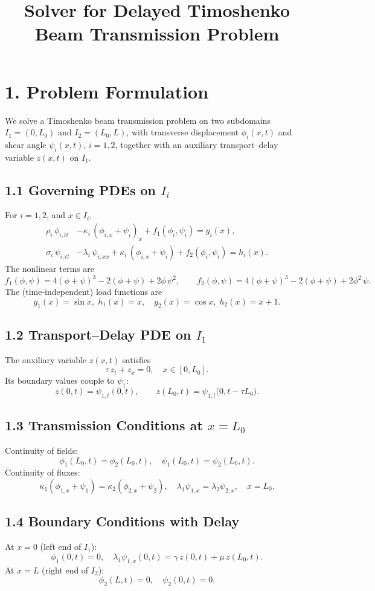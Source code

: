 \documentclass[a4paper,11pt]{article}
\title{Solver for Delayed Timoshenko Beam Transmission Problem}
\author{}
\date{}
\begin{document}
\maketitle

\section*{1. Problem Formulation}
We solve a Timoshenko beam transmission problem on two subdomains
\(I_1=(0,L_0)\) and \(I_2=(L_0,L)\), with transverse displacement \(\phi_i(x,t)\) and shear angle \(\psi_i(x,t)\), \(i=1,2\), together with an auxiliary transport–delay variable \(z(x,t)\) on \(I_1\).

\subsection*{1.1 Governing PDEs on \(I_i\)}
For \(i=1,2\), and \(x\in I_i\),
\begin{align}
\rho_i\,\phi_{i,tt} & - \kappa_i\,(\phi_{i,x}+\psi_i)_x + f_1(\phi_i,\psi_i) = g_i(x), \\
\sigma_i\,\psi_{i,tt} & - \lambda_i\,\psi_{i,xx} + \kappa_i\,(\phi_{i,x}+\psi_i) + f_2(\phi_i,\psi_i) = h_i(x).
\end{align}
The nonlinear terms are
\[
f_1(\phi,\psi) = 4(\phi+\psi)^3 - 2(\phi+\psi) + 2\phi\,\psi^2,
\qquad
f_2(\phi,\psi) = 4(\phi+\psi)^3 - 2(\phi+\psi) + 2\phi^2\,\psi.
\]
The (time‐independent) load functions are
\[
g_1(x)=\sin x, \; h_1(x)=x, \quad
g_2(x)=\cos x, \; h_2(x)=x+1.
\]

\subsection*{1.2 Transport–Delay PDE on \(I_1\)}
The auxiliary variable \(z(x,t)\) satisfies
\[
\tau\,z_t + z_x = 0, \quad x\in[0,L_0].
\]
Its boundary values couple to \(\psi_1\):
\[
z(0,t) = \psi_{1,t}(0,t),
\qquad
z(L_0,t) = \psi_{1,t}\bigl(0,t-\tau L_0\bigr).
\]

\subsection*{1.3 Transmission Conditions at \(x=L_0\)}
Continuity of fields:
\[
\phi_1(L_0,t)=\phi_2(L_0,t),
\quad
\psi_1(L_0,t)=\psi_2(L_0,t).
\]
Continuity of fluxes:
\[
\kappa_1(\phi_{1,x}+\psi_1)=\kappa_2(\phi_{2,x}+\psi_2),
\quad
\lambda_1\psi_{1,x}=\lambda_2\psi_{2,x},
\quad x=L_0.
\]

\subsection*{1.4 Boundary Conditions with Delay}
At \(x=0\) (left end of \(I_1\)):
\[
\phi_1(0,t)=0,
\quad
\lambda_1\psi_{1,x}(0,t) = \gamma\,z(0,t) + \mu\,z(L_0,t).
\]
At \(x=L\) (right end of \(I_2\)):
\[
\phi_2(L,t)=0,
\quad
\psi_2(0,t)=0.
\]
\end{document}

